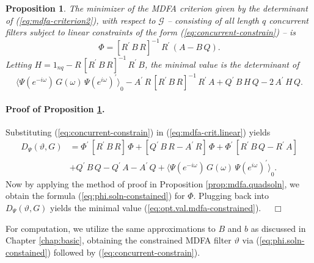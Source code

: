 \documentclass[a4paper]{book}
\newtheorem{Proposition}{Proposition}
\begin{document}
\begin{Proposition}
\label{prop:mdfa.quadsoln-constrain}
 The minimizer of the  MDFA criterion given by the determinant of
 (\ref{eq:mdfa-criterion2}),  with respect to  $\mathcal{G}$  -- consisting 
 of all length $q$ concurrent filters 
 subject to  linear constraints of the form (\ref{eq:concurrent-constrain}) -- is
\begin{equation}
\label{eq:phi.soln-constained}
 \Phi =  { \left[ R^{\prime} \, B \, R \right] }^{-1} \, R^{\prime} \, 
 \left( A - B \, Q \right).
\end{equation}
  Letting $H = 1_{nq} - R \,   { \left[ R^{\prime} \, B \, R \right] }^{-1} \,
  R^{\prime} \, B$, the minimal value is the determinant of
\begin{equation}
\label{eq:opt.val.mdfa-constrained}
{ \langle \Psi (e^{-i \omega}) \, G (\omega) \, { \Psi (e^{i \omega}) }^{\prime} \rangle }_0 -
 A^{\prime} \, R \, { \left[ R^{\prime} \, B \, R \right] }^{-1} \, R^{\prime} \,  A
	+ Q^{\prime} \, B \, H \, Q - 2 \, A^{\prime} \, H \, Q.
\end{equation}
\end{Proposition}

 
  
\paragraph{Proof of Proposition \ref{prop:mdfa.quadsoln-constrain}.}
 Substituting (\ref{eq:concurrent-constrain}) in (\ref{eq:mdfa-crit.linear}) yields
\begin{align*}
  D_{\Psi} (\vartheta, G) &  = \Phi^{\prime} \,  
  \left[ R^{\prime} \, B \, R \right] \,  \Phi 
  + \left[ Q^{\prime} \, B \, R - A^{\prime} \, R \right] \, \Phi + \Phi^{\prime} \,
   \left[ R^{\prime} \, B \, Q - R^{\prime} \, A \right]  \\
 & + Q^{\prime} \, B \, Q  - Q^{\prime} \, A - A^{\prime} \, Q  + 
{ \langle \Psi (e^{-i \omega}) \, G (\omega) \, { \Psi (e^{i \omega}) }^{\prime} \rangle }_0.
\end{align*}
  Now by applying the method of proof in Proposition \ref{prop:mdfa.quadsoln}, we obtain 
  the formula (\ref{eq:phi.soln-constained}) for $\Phi$.  Plugging back into
  $D_{\Psi} (\vartheta, G)$ yields the minimal value 
  (\ref{eq:opt.val.mdfa-constrained}).  $\quad \Box$

\vspace{.5cm}

For computation, we utilize the same approximations to $B$ and $b$ as discussed 
in  Chapter \ref{chap:basic},
 obtaining the constrained MDFA filter $\vartheta$ via (\ref{eq:phi.soln-constained})
 followed by (\ref{eq:concurrent-constrain}).
\end{document}
